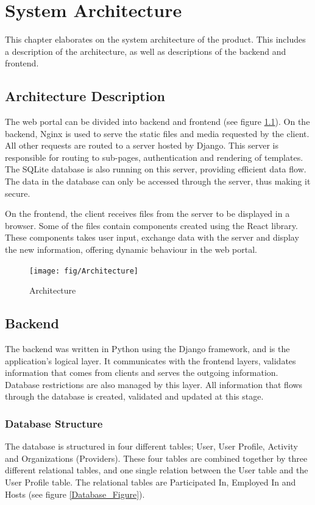 
\chapter{System Architecture}
This chapter elaborates on the system architecture of the product. This includes a description of the architecture, as well as descriptions of the backend and frontend. 

\section{Architecture Description}
The web portal can be divided into backend and frontend (see figure \ref{Architecture}). On the backend, Nginx is used to serve the static files and media requested by the client. All other requests are routed to a server hosted by Django. This server is responsible for routing to sub-pages, authentication and rendering of templates. The SQLite database is also running on this server, providing efficient data flow. The data in the database can only be accessed through the server, thus making it secure.

On the frontend, the client receives files from the server to be displayed in a browser. Some of the files contain components created using the React library. These components takes user input, exchange data with the server and display the new information, offering dynamic behaviour in the web portal.

\begin{figure}[ht]
\centering
    \texttt{[image: fig/Architecture]}
\caption{Architecture}
\label{Architecture}
\end{figure}

\section{Backend}
The backend was written in Python using the Django framework, and is the application's logical layer. It communicates with the frontend layers, validates information that comes from clients and serves the outgoing information. Database restrictions are also managed by this layer. All information that flows through the database is created, validated and updated at this stage. 


\subsection{Database Structure}
The database is structured in four different tables; User, User Profile, Activity and Organizations (Providers). These four tables are combined together by three different relational tables, and one single relation between the User table and the User Profile table. The relational tables are Participated In, Employed In and Hosts (see figure \ref{Database_Figure}).

